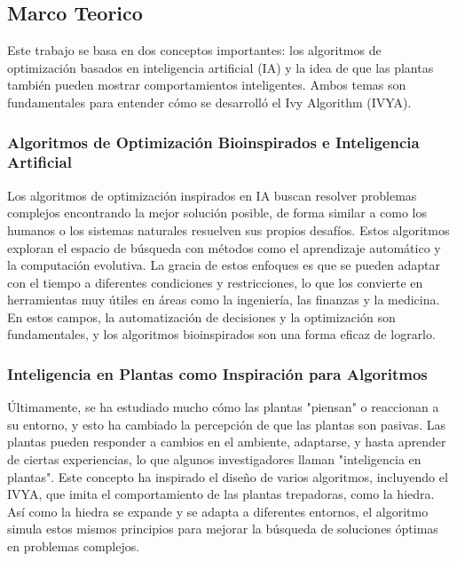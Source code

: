 \subsection{Marco Teorico} %
Este trabajo se basa en dos conceptos importantes: los algoritmos de
optimización basados en inteligencia artificial (IA) y la idea de que las
plantas también pueden mostrar comportamientos inteligentes. Ambos temas son
fundamentales para entender cómo se desarrolló el Ivy Algorithm (IVYA).

\subsubsection*{Algoritmos de Optimización Bioinspirados e Inteligencia Artificial}
Los algoritmos de optimización inspirados en IA buscan resolver problemas
complejos encontrando la mejor solución posible, de forma similar a como los
humanos o los sistemas naturales resuelven sus propios desafíos. Estos
algoritmos exploran el espacio de búsqueda con métodos como el aprendizaje
automático y la computación evolutiva. La gracia de estos enfoques es que se
pueden adaptar con el tiempo a diferentes condiciones y restricciones, lo que
los convierte en herramientas muy útiles en áreas como la ingeniería, las
finanzas y la medicina. En estos campos, la automatización de decisiones y la
optimización son fundamentales, y los algoritmos bioinspirados son una forma
eficaz de lograrlo.

\subsubsection{Inteligencia en Plantas como Inspiración para Algoritmos}
Últimamente, se ha estudiado mucho cómo las plantas "piensan" o reaccionan a su
entorno, y esto ha cambiado la percepción de que las plantas son pasivas. Las
plantas pueden responder a cambios en el ambiente, adaptarse, y hasta aprender
de ciertas experiencias, lo que algunos investigadores llaman "inteligencia en
plantas". Este concepto ha inspirado el diseño de varios algoritmos, incluyendo
el IVYA, que imita el comportamiento de las plantas trepadoras, como la hiedra.
Así como la hiedra se expande y se adapta a diferentes entornos, el algoritmo
simula estos mismos principios para mejorar la búsqueda de soluciones óptimas
en problemas complejos.

